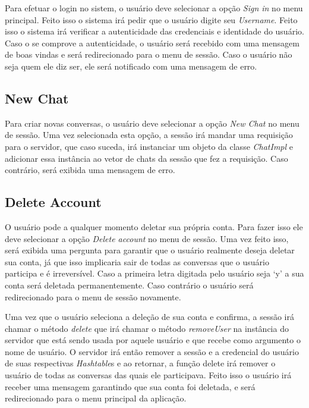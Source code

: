 \documentclass[../main.tex]{subfiles}
\begin{document}
Para efetuar o login no sistem, o usuário deve selecionar a opção \textit{Sign in} no menu principal.
Feito isso o sistema irá pedir que o usuário digite seu \textit{Username}. Feito isso o sistema irá verificar a autenticidade das credenciais e identidade do usuário. Caso o se comprove a autenticidade, o usuário será recebido com uma mensagem de boas vindas e será redirecionado para o menu de sessão. Caso o usuário não seja quem ele diz ser, ele será notificado com uma mensagem de erro.

\subsection{New Chat}

Para criar novas conversas, o usuário deve selecionar a opção \textit{New Chat} no menu de sessão.
Uma vez selecionada esta opção, a sessão irá mandar uma requisição para o servidor, que caso suceda, irá instanciar um objeto da classe \textit{ChatImpl} e adicionar essa instância ao vetor de chats da sessão que fez a requisição. Caso contrário, será exibida uma mensagem de erro.

\subsection{Delete Account}

O usuário pode a qualquer momento deletar sua própria conta. Para fazer isso ele deve selecionar a opção \textit{Delete account} no menu de sessão. Uma vez feito isso, será exibida uma pergunta para garantir que o usuário realmente deseja deletar sua conta, já que isso implicaria sair de todas as conversas que o usuário participa e é irreversível. Caso a primeira letra digitada pelo usuário seja `y' a sua conta será deletada permanentemente. Caso contrário o usuário será redirecionado para o menu de sessão novamente.

Uma vez que o usuário seleciona a deleção de sua conta e confirma, a sessão irá chamar o método \textit{delete} que irá chamar o método \textit{removeUser} na instância do servidor que está sendo usada por aquele usuário e que recebe como argumento o nome de usuário. O servidor irá então remover a sessão e a credencial do usuário de suas respectivas \textit{Hashtable}s e ao retornar, a função delete irá remover o usuário de todas as conversas das quais ele participava. Feito isso o usuário irá receber uma mensagem garantindo que sua conta foi deletada, e será redirecionado para o menu principal da aplicação.
\end{document}
